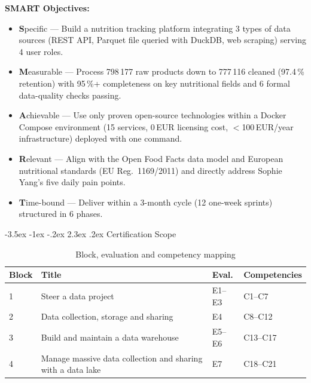 \documentclass[a4paper,11pt,oneside,openany]{report}
\makeatletter
\renewcommand\section{\@startsection{section}{1}{\z@}%
  {-3.5ex \@plus -1ex \@minus -.2ex}%
  {2.3ex \@plus.2ex}%
  {\normalfont\Large\bfseries\color{ntgreen}}}
\newcommand{\off}{Open Food Facts}
\makeatother
\begin{document}
\textbf{SMART Objectives:}
\begin{itemize}[nosep]
  \item \textbf{S}pecific --- Build a nutrition tracking platform integrating
        3 types of data sources (REST API, Parquet file queried with DuckDB,
        web scraping) serving 4 user roles.
  \item \textbf{M}easurable --- Process 798\,177 raw products down to 777\,116
        cleaned (97.4\,\% retention) with 95\,\%+ completeness on key
        nutritional fields and 6 formal data-quality checks passing.
  \item \textbf{A}chievable --- Use only proven open-source technologies within
        a Docker Compose environment (15 services, 0\,EUR licensing cost,
        $<$100\,EUR/year infrastructure) deployed with one command.
  \item \textbf{R}elevant --- Align with the \off{} data model and European
        nutritional standards (EU Reg.~1169/2011) and directly address Sophie
        Yang's five daily pain points.
  \item \textbf{T}ime-bound --- Deliver within a 3-month cycle (12 one-week
        sprints) structured in 6 phases.
\end{itemize}

\section{Certification Scope}

\begin{table}[H]
\centering
\caption{Block, evaluation and competency mapping}
\label{tab:bloc-eval}
\begin{tabularx}{\textwidth}{C{1.5cm} L{5cm} C{1.5cm} L{4cm}}
\toprule
\textbf{Block} & \textbf{Title} & \textbf{Eval.} & \textbf{Competencies} \\
 & Steer a data project & E1--E3 & C1--C7 \\
2 & Data collection, storage and sharing & E4 & C8--C12 \\
3 & Build and maintain a data warehouse & E5--E6 & C13--C17 \\
4 & Manage massive data collection and sharing with a data lake & E7 & C18--C21 \\
\bottomrule
\end{tabularx}
\end{table}

\end{document}
